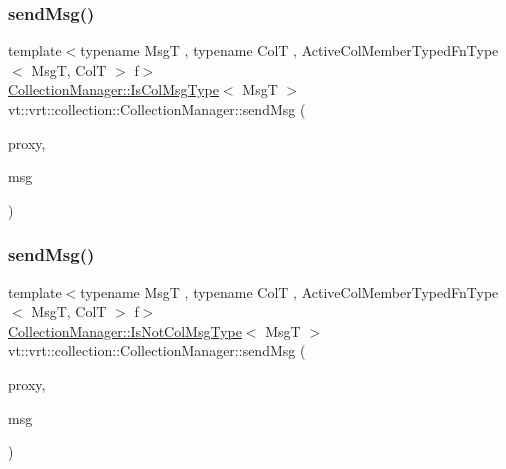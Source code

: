 \mbox{\label{structvt_1_1vrt_1_1collection_1_1_collection_manager_a55777b57bfad6c9d87d946ed773a391d}} 
\subsubsection{\texorpdfstring{send\+Msg()}{sendMsg()}\hspace{0.1cm}{\footnotesize\ttfamily [3/6]}}
{\footnotesize\ttfamily template$<$typename MsgT , typename ColT , Active\+Col\+Member\+Typed\+Fn\+Type$<$ Msg\+T, Col\+T $>$ f$>$ \\
\hyperlink{structvt_1_1vrt_1_1collection_1_1_collection_manager_a21c21612c806016788057aeab142af20}{Collection\+Manager\+::\+Is\+Col\+Msg\+Type}$<$ MsgT $>$ vt\+::vrt\+::collection\+::\+Collection\+Manager\+::send\+Msg (\begin{DoxyParamCaption}\item[{\hyperlink{namespacevt_1_1vrt_a620a5c8c59d13e513f690c74b4af516f}{Virtual\+Elm\+Proxy\+Type}$<$ ColT $>$ const \&}]{proxy,  }\item[{MsgT $\ast$}]{msg }\end{DoxyParamCaption})}

\mbox{\label{structvt_1_1vrt_1_1collection_1_1_collection_manager_a4f87f7f738cde8d48c9c18d16cc06166}} 
\subsubsection{\texorpdfstring{send\+Msg()}{sendMsg()}\hspace{0.1cm}{\footnotesize\ttfamily [4/6]}}
{\footnotesize\ttfamily template$<$typename MsgT , typename ColT , Active\+Col\+Member\+Typed\+Fn\+Type$<$ Msg\+T, Col\+T $>$ f$>$ \\
\hyperlink{structvt_1_1vrt_1_1collection_1_1_collection_manager_ae376deeefd4f89a0b1c93849977715d9}{Collection\+Manager\+::\+Is\+Not\+Col\+Msg\+Type}$<$ MsgT $>$ vt\+::vrt\+::collection\+::\+Collection\+Manager\+::send\+Msg (\begin{DoxyParamCaption}\item[{\hyperlink{namespacevt_1_1vrt_a620a5c8c59d13e513f690c74b4af516f}{Virtual\+Elm\+Proxy\+Type}$<$ ColT $>$ const \&}]{proxy,  }\item[{MsgT $\ast$}]{msg }\end{DoxyParamCaption})}

